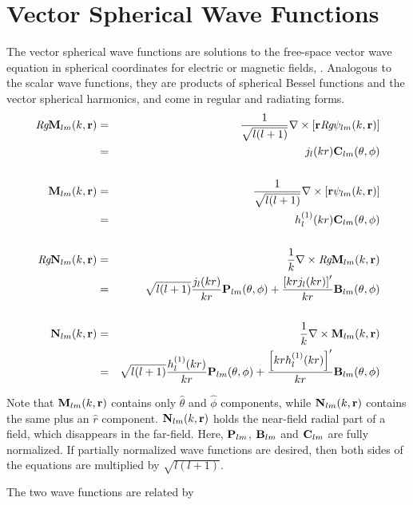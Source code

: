 \section{Vector Spherical Wave Functions}
\label{sec:vecsphwave}
The vector spherical wave functions are solutions to the free-space vector wave equation in spherical coordinates for electric or magnetic fields, \cite{chew1995waves, tsang2000scattering}.  Analogous to the scalar wave functions, they are products of spherical Bessel functions and the vector spherical harmonics, and come in regular and radiating forms. 
\begin{eqnarray}
\textit{Rg}\mathbf{M}_{lm}(k,\mathbf{r}) &=& \dfrac{1}{\sqrt{l(l+1)}}\nabla \times \left[ \mathbf{r} \textit{Rg}\psi_{lm}(k,\mathbf{r})\right]  \\
\ &= & j_l(kr) \mathbf{C}_{lm}(\theta,\phi) \\ 
\ & \ & \  \nonumber  \\
\mathbf{M}_{lm}(k,\mathbf{r}) &=& \dfrac{1}{\sqrt{l(l+1)}}\nabla \times \left[ \mathbf{r} \psi_{lm}(k,\mathbf{r})\right]  \\
\ &= & h_l^{(1)}(kr) \mathbf{C}_{lm}(\theta,\phi) \\
\ & \ & \  \nonumber \\
\textit{Rg}\mathbf{N}_{lm}(k,\mathbf{r}) &=&  \dfrac{1}{k} \nabla \times \textit{Rg}\mathbf{M}_{lm}(k,\mathbf{r})  \\
\ &=&  \sqrt{l(l+1)}\dfrac{j_l(kr)}{kr} \mathbf{P}_{lm} (\theta,\phi) + \dfrac{\left[kr j_l(kr)\right]'}{kr} \mathbf{B}_{lm}(\theta,\phi) \\
\ & \ & \  \nonumber \\
\mathbf{N}_{lm}(k,\mathbf{r}) &=&  \dfrac{1}{k} \nabla \times \mathbf{M}_{lm}(k,\mathbf{r})  \\
\ &=&  \sqrt{l(l+1)}\dfrac{h_l^{(1)}(kr)}{kr} \mathbf{P}_{lm} (\theta,\phi) + \dfrac{\left[kr h_l^{(1)}(kr)\right]'}{kr} \mathbf{B}_{lm}(\theta,\phi)  
\end{eqnarray}

Note that $\mathbf{M}_{lm}(k,\mathbf{r})$ contains only $\hat\theta$ and $\hat\phi$ components, while $\mathbf{N}_{lm}(k,\mathbf{r})$ contains the same plus an $\hat r$ component.  $\mathbf{N}_{lm}(k,\mathbf{r})$ holds the near-field radial part of a field, which disappears in the far-field.  Here, $\mathbf{P}_{lm}$, $\mathbf{B}_{lm}$ and $\mathbf{C}_{lm}$ are fully normalized. If partially normalized wave functions are desired, then both sides of the equations are multiplied by $\sqrt{l(l+1)}$. 


The two wave functions are related by 


